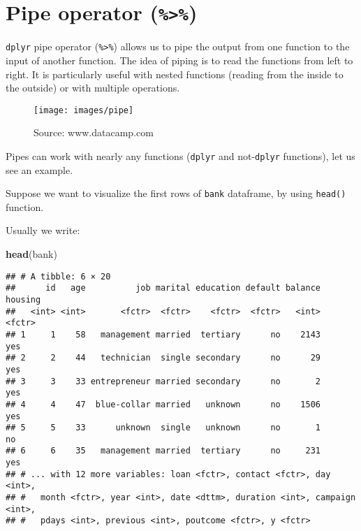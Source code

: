 \documentclass[]{book}
\newenvironment{Shaded}{\begin{snugshade}}{\end{snugshade}}
\newcommand{\KeywordTok}[1]{\textcolor[rgb]{0.13,0.29,0.53}{\textbf{{#1}}}}
\newcommand{\NormalTok}[1]{{#1}}
\begin{document}
\section{\texorpdfstring{Pipe operator
(\texttt{\%\textgreater{}\%})}{Pipe operator (\%\textgreater{}\%)}}\label{pipe-operator}

\texttt{dplyr} pipe operator (\texttt{\%\textgreater{}\%}) allows us to
pipe the output from one function to the input of another function. The
idea of piping is to read the functions from left to right. It is
particularly useful with nested functions (reading from the inside to
the outside) or with multiple operations.

\clearpage

\begin{figure}
\texttt{[image: images/pipe]} \caption{Source: www.datacamp.com}\label{fig:g2}
\end{figure}

Pipes can work with nearly any functions (\texttt{dplyr} and
not-\texttt{dplyr} functions), let us see an example.

Suppose we want to visualize the first rows of \texttt{bank} dataframe,
by using \texttt{head()} function.

Usually we write:

\begin{Shaded}
\begin{Highlighting}[]
\KeywordTok{head}\NormalTok{(bank)}
\end{Highlighting}
\end{Shaded}

\begin{verbatim}
## # A tibble: 6 × 20
##      id   age          job marital education default balance housing
##   <int> <int>       <fctr>  <fctr>    <fctr>  <fctr>   <int>  <fctr>
## 1     1    58   management married  tertiary      no    2143     yes
## 2     2    44   technician  single secondary      no      29     yes
## 3     3    33 entrepreneur married secondary      no       2     yes
## 4     4    47  blue-collar married   unknown      no    1506     yes
## 5     5    33      unknown  single   unknown      no       1      no
## 6     6    35   management married  tertiary      no     231     yes
## # ... with 12 more variables: loan <fctr>, contact <fctr>, day <int>,
## #   month <fctr>, year <int>, date <dttm>, duration <int>, campaign <int>,
## #   pdays <int>, previous <int>, poutcome <fctr>, y <fctr>
\end{verbatim}
\end{document}

